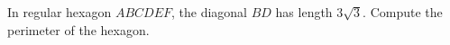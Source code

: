 In regular hexagon $ABCDEF$, the diagonal $BD$ has length $3\sqrt3$. Compute the perimeter of the hexagon.
